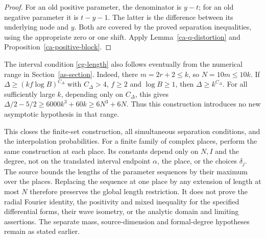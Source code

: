\begin{proof}
For an old positive parameter, the denominator is
$y-t$; for an old negative parameter it is
$t-y-1$.  The latter is the difference between its
underlying node and $y$.  Both are covered by the
proved separation inequalities, using the appropriate
zero or one shift.  Apply
Lemma~\ref{ca-q-distortion} and
Proposition~\ref{ca-positive-block}.
\end{proof}

The interval condition \eqref{cg-length} also follows
eventually from the numerical range in
Section~\ref{as-section}.  Indeed, there $m=2r+2\leq k$,
so $N=10m\leq10k$.  If
$\Delta\geq(kf\log B)^{C_\Delta}$ with $C_\Delta>4$,
$f\geq2$ and $\log B\geq1$, then
$\Delta\geq k^{C_\Delta}$.
For all sufficiently large $k$, depending only on
$C_\Delta$, this gives
$\Delta/2-5/2\geq6000k^3+60k\geq6N^3+6N$.
Thus this construction introduces no new asymptotic
hypothesis in that range.

This closes the finite-set construction, all simultaneous
separation conditions, and the interpolation probabilities.
For a finite family of complex places, perform the same
construction at each place.  Its constants depend only on
$N,I$ and the degree, not on the translated interval
endpoint $\alpha$, the place, or the choices $\delta_j$.
The source bounds the lengths of the parameter sequences
by their maximum over the places.  Replacing the sequence
at one place by any extension of length at most $N$
therefore preserves the global length restriction.
It does not prove the radial Fourier identity, the
positivity and mixed inequality for the specified
differential forms, their wave isometry, or the analytic
domain and limiting assertions.  The separate mass,
source-dimension and formal-degree hypotheses remain
as stated earlier.


